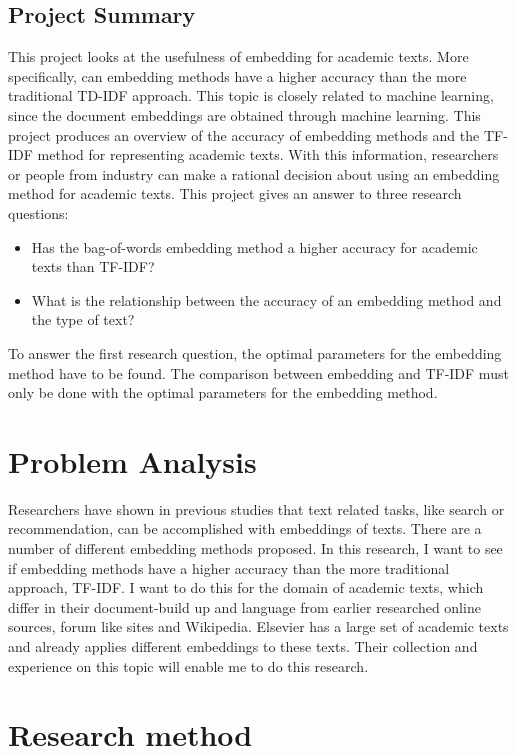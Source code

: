 \documentclass[10pt,a4paper]{article}
\begin{document}
\subsection{Project Summary}
This project looks at the usefulness of embedding for academic texts. More specifically, can embedding methods have a higher accuracy than the more traditional TD-IDF approach. This topic is closely related to machine learning, since the document embeddings are obtained through machine learning. This project produces an overview of the accuracy of embedding methods and the TF-IDF method for representing academic texts. With this information, researchers or people from industry can make a rational decision about using an embedding method for academic texts. This project gives an answer to three research questions:
\begin{itemize}
\item{Has the bag-of-words embedding method a higher accuracy for academic texts than TF-IDF?}
\item{What is the relationship between the accuracy of an embedding method and the type of text?}
\end{itemize}
To answer the first research question, the optimal parameters for the embedding method have to be found. The comparison between embedding and TF-IDF must only be done with the optimal parameters for the embedding method.
\section{Problem Analysis}
Researchers have shown in previous studies that text related tasks, like search or recommendation, can be accomplished with embeddings of texts. There are a number of different embedding methods proposed. In this research, I want to see if embedding methods have a higher accuracy than the more traditional approach, TF-IDF. I want to do this for the domain of academic texts, which differ in their document-build up and language from earlier researched online sources, forum like sites and Wikipedia. Elsevier has a large set of academic texts and already applies different embeddings to these texts. Their collection and experience on this topic will enable me to do this research.

\section{Research method}
\end{document}
